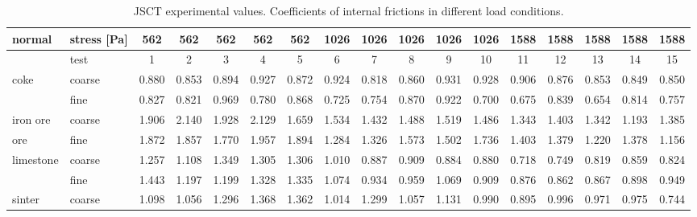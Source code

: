 \begin{sidewaystable}%
\centering
\begin{tabular}{ll|ccccccccccccccc}
\hline
    normal & stress [Pa] & 562   & 562   & 562   & 562   & 562   & 1026  & 1026  & 1026  & 1026  & 1026  & 1588  & 1588  & 1588  & 1588  & 1588 \\
\hline 
          & test  & 1     & 2     & 3     & 4     & 5     & 6     & 7     & 8     & 9     & 10    & 11    & 12    & 13    & 14    & 15 \\
\hline
    coke  & coarse & 0.880 & 0.853 & 0.894 & 0.927 & 0.872 & 0.924 & 0.818 & 0.860 & 0.931 & 0.928 & 0.906 & 0.876 & 0.853 & 0.849 & 0.850 \\
      & fine  & 0.827 & 0.821 & 0.969 & 0.780 & 0.868 & 0.725 & 0.754 & 0.870 & 0.922 & 0.700 & 0.675 & 0.839 & 0.654 & 0.814 & 0.757 \\
\hline
    iron ore & coarse & 1.906 & 2.140 & 1.928 & 2.129 & 1.659 & 1.534 & 1.432 & 1.488 & 1.519 & 1.486 & 1.343 & 1.403 & 1.342 & 1.193 & 1.385 \\
     ore & fine  & 1.872 & 1.857 & 1.770 & 1.957 & 1.894 & 1.284 & 1.326 & 1.573 & 1.502 & 1.736 & 1.403 & 1.379 & 1.220 & 1.378 & 1.156 \\
\hline
    limestone & coarse & 1.257 & 1.108 & 1.349 & 1.305 & 1.306 & 1.010 & 0.887 & 0.909 & 0.884 & 0.880 & 0.718 & 0.749 & 0.819 & 0.859 & 0.824 \\
     & fine  & 1.443 & 1.197 & 1.199 & 1.328 & 1.335 & 1.074 & 0.934 & 0.959 & 1.069 & 0.909 & 0.876 & 0.862 & 0.867 & 0.898 & 0.949 \\
\hline
    sinter & coarse & 1.098 & 1.056 & 1.296 & 1.368 & 1.362 & 1.014 & 1.299 & 1.057 & 1.131 & 0.990 & 0.895 & 0.996 & 0.971 & 0.975 & 0.744 \\
         \hline
\end{tabular}
\caption[JSCT experimental values]{\acs{JSCT} experimental values.
Coefficients of internal frictions in different load conditions.}
\label{tab:24shearcell4}
\end{sidewaystable}